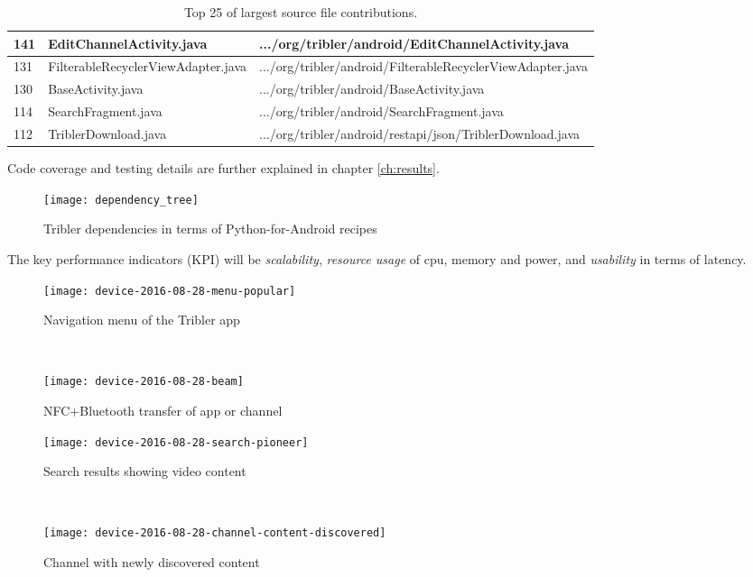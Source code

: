 \begin{table}
\begin{tabular}{l | l | l}
		141 &		EditChannelActivity.java &		.../org/tribler/android/EditChannelActivity.java \\ \hline
		131 &		FilterableRecyclerViewAdapter.java &		.../org/tribler/android/FilterableRecyclerViewAdapter.java \\ \hline
		130 & 		BaseActivity.java &		.../org/tribler/android/BaseActivity.java \\ \hline
		114 &		SearchFragment.java &		.../org/tribler/android/SearchFragment.java \\ \hline
		112 & 		TriblerDownload.java &		.../org/tribler/android/restapi/json/TriblerDownload.java \\ \hline
	\end{tabular}
	\caption{Top 25 of largest source file contributions.}
	\label{table:loc}
\end{table}

Code coverage and testing details are further explained in chapter \ref{ch:results}.


\begin{figure}
	\centering
	\texttt{[image: dependency\_tree]}
	\caption{Tribler dependencies in terms of Python-for-Android recipes}
	\label{fig:dependency_tree}
\end{figure}


The key performance indicators (KPI) will be \emph{scalability}, \emph{resource usage} of cpu, memory and power, and \emph{usability} in terms of latency.

\begin{figure}
	\centering
\begin{minipage}{.4\textwidth}
	\texttt{[image: device-2016-08-28-menu-popular]}
	\caption{Navigation menu of the Tribler app}
	\label{fig:menu-popular}
\end{minipage}
~
\begin{minipage}{.4\textwidth}
	\texttt{[image: device-2016-08-28-beam]}
	\caption{NFC+Bluetooth transfer of app or channel}
	\label{fig:beam}
\end{minipage}

\begin{minipage}{.4\textwidth}
	\texttt{[image: device-2016-08-28-search-pioneer]}
	\caption{Search results showing video content}
	\label{fig:search-pioneer}
\end{minipage}
~
\begin{minipage}{.4\textwidth}
	\texttt{[image: device-2016-08-28-channel-content-discovered]}
	\caption{Channel with newly discovered content}
	\label{fig:channel-content-discovered}
\end{minipage}
\end{figure}